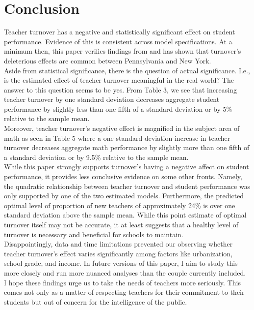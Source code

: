 \documentclass[12pt]{report}
\begin{document}
\section{Conclusion}
\noindent Teacher turnover has a negative and statistically significant effect on student performance. Evidence of this is consistent across model specifications. At a minimum then, this paper verifies findings from \cite{ronfeldt} and has shown that turnover's deleterious effects are common between Pennsylvania and New York.\\
\indent Aside from statistical significance, there is the question of actual significance. I.e., is the estimated effect of teacher turnover meaningful in the real world? The answer to this question seems to be yes. From Table 3, we see that increasing teacher turnover by one standard deviation decreases aggregate student performance by slightly less than one fifth of a standard deviation or by 5\% relative to the sample mean.\\
\indent Moreover, teacher turnover's negative effect is magnified in the subject area of math as seen in Table 5 where a one standard deviation increase in teacher turnover decreases aggregate math performance by slightly more than one fifth of a standard deviation or by 9.5\% relative to the sample mean.\\
\indent While this paper strongly supports turnover's having a negative affect on student performance, it provides less conclusive evidence on some other fronts. Namely, the quadratic relationship between teacher turnover and student performance was only supported by one of the two estimated models. Furthermore, the predicted optimal level of proportion of new teachers of approximately 24\% is over one standard deviation above the sample mean. While this point estimate of optimal turnover itself may not be accurate, it at least suggests that a healthy level of turnover is necessary and beneficial for schools to maintain. \\
\indent Disappointingly, data and time limitations prevented our observing whether teacher turnover's effect varies significantly among factors like urbanization, school-grade, and income. In future versions of this paper, I aim to study this more closely and run more nuanced analyses than the couple currently included.\\
\indent I hope these findings urge us to take the needs of teachers more seriously. This comes not only as a matter of respecting teachers for their commitment to their students but out of concern for the intelligence of the public. 
\end{document}
